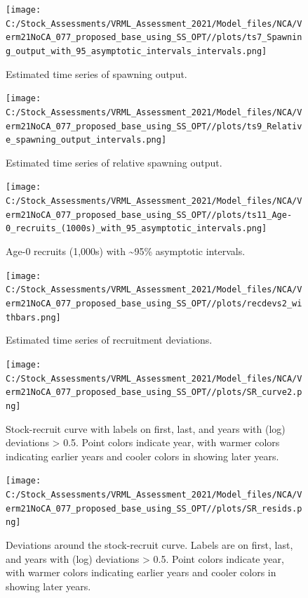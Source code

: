 \documentclass[
  english,
  a4paper,
]{article}
\begin{document}
\FloatBarrier

\begin{figure}
\centering
\texttt{[image: C:/Stock\_Assessments/VRML\_Assessment\_2021/Model\_files/NCA/Verm21NoCA\_077\_proposed\_base\_using\_SS\_OPT//plots/ts7\_Spawning\_output\_with\_95\_asymptotic\_intervals\_intervals.png]}
\caption{Estimated time series of spawning output.\label{fig:ssb}}
\end{figure}

\begin{figure}
\centering
\texttt{[image: C:/Stock\_Assessments/VRML\_Assessment\_2021/Model\_files/NCA/Verm21NoCA\_077\_proposed\_base\_using\_SS\_OPT//plots/ts9\_Relative\_spawning\_output\_intervals.png]}
\caption{Estimated time series of relative spawning output.\label{fig:depl}}
\end{figure}

\FloatBarrier

\begin{figure}
\centering
\texttt{[image: C:/Stock\_Assessments/VRML\_Assessment\_2021/Model\_files/NCA/Verm21NoCA\_077\_proposed\_base\_using\_SS\_OPT//plots/ts11\_Age-0\_recruits\_(1000s)\_with\_95\_asymptotic\_intervals.png]}
\caption{Age-0 recruits (1,000s) with \textasciitilde95\% asymptotic intervals.\label{fig:recruits}}
\end{figure}

\begin{figure}
\centering
\texttt{[image: C:/Stock\_Assessments/VRML\_Assessment\_2021/Model\_files/NCA/Verm21NoCA\_077\_proposed\_base\_using\_SS\_OPT//plots/recdevs2\_withbars.png]}
\caption{Estimated time series of recruitment deviations.\label{fig:recdevs}}
\end{figure}

\begin{figure}
\centering
\texttt{[image: C:/Stock\_Assessments/VRML\_Assessment\_2021/Model\_files/NCA/Verm21NoCA\_077\_proposed\_base\_using\_SS\_OPT//plots/SR\_curve2.png]}
\caption{Stock-recruit curve with labels on first, last, and years with (log) deviations \textgreater{} 0.5. Point colors indicate year, with warmer colors indicating earlier years and cooler colors in showing later years.\label{fig:bh-curve}}
\end{figure}

\begin{figure}
\centering
\texttt{[image: C:/Stock\_Assessments/VRML\_Assessment\_2021/Model\_files/NCA/Verm21NoCA\_077\_proposed\_base\_using\_SS\_OPT//plots/SR\_resids.png]}
\caption{Deviations around the stock-recruit curve. Labels are on first, last, and years with (log) deviations \textgreater{} 0.5. Point colors indicate year, with warmer colors indicating earlier years and cooler colors in showing later years.\label{fig:bh-resids}}
\end{figure}
\end{document}
